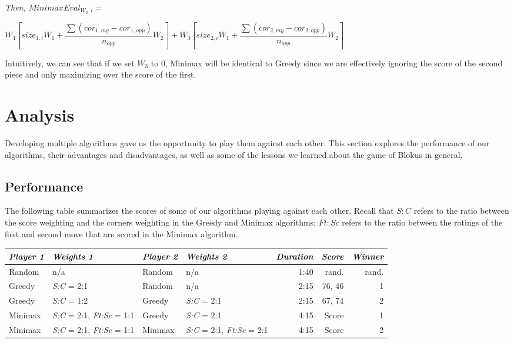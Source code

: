 \documentclass[11pt]{article}
\begin{document}
{\it Then,} $MinimaxEval_{W_2, i} =$

\begin{center} $W_4 \left [ size_{1,i} W_1 + \dfrac{\sum{(cor_{1,my} - cor_{1,opp})}}{n_{opp}} W_2 \right ]
+ W_3 \left [ size_{2,i} W_1 + \dfrac{\sum{(cor_{2,my} - cor_{2,opp})}}{n_{opp}} W_2 \right ]$ \end{center}

\bigskip

\noindent Intuitively, we can see that if we set $W_3$ to $0$, Minimax will be identical to Greedy since we are effectively ignoring the score of the second piece and only maximizing over the score of the first.


\pagebreak


\section{Analysis}

Developing multiple algorithms gave us the opportunity to play them against each other. This section explores the performance of our algorithms, their advantages and disadvantages, as well as some of the lessons we learned about the game of Blokus in general.

\subsection{Performance}

The following table summarizes the scores of some of our algorithms playing against each other. Recall that $S:C$ refers to the ratio between the score weighting and the corners weighting in the Greedy and Minimax algorithms; $Ft:Sc$ refers to the ratio between the ratings of the first and second move that are scored in the Minimax algorithm.

\bigskip
\begin{center}
\begin{tabular}{|l|l|l|l||r|r|r|}
\hline
{\it Player 1} & {\it Weights 1 } & {\it Player 2} & {\it Weights 2} & {\it Duration} & {\it Score} & {\it Winner} \\
\hline
Random & n/a & Random & n/a & 1:40 & rand. & rand. \\
\hline
Greedy & {\it S:C} = 2:1 & Random & n/a & 2:15 & 76, 46 & 1 \\
\hline
Greedy & {\it S:C} = 1:2 & Greedy & {\it S:C} = 2:1 & 2:15 & 67, 74 & 2 \\
\hline
Minimax & {\it S:C} = 2:1, {\it Ft:Sc} = 1:1 & Greedy & {\it S:C} = 2:1 & 4:15 & Score & 1 \\
\hline
Minimax & {\it S:C} = 2:1, {\it Ft:Sc} = 1:1 & Minimax & {\it S:C} = 2:1, {\it Ft:Sc} = 2:1 & 4:15 & Score & 2 \\
\hline
\end{tabular}
\end{center}
\bigskip
\end{document}

